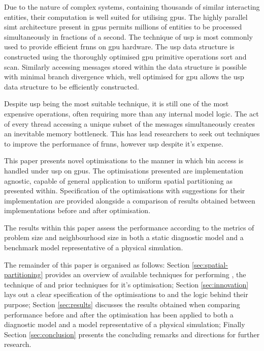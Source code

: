   Due to the nature of complex systems, containing thousands of similar interacting entities, their computation is well suited for utilising \glspl{gpu}. The highly parallel \gls{simt} architecture present in \glspl{gpu} permits millions of entities to be processed simultaneously in fractions of a second. The technique of \gls{usp} is most commonly used to provide efficient \gls{frnns} on \gls{gpu} hardware. The \gls{usp} data structure is constructed using the thoroughly optimised \gls{gpu} primitive operations sort and scan. Similarly accessing messages stored within the data structure is possible with minimal branch divergence which, well optimised for \gls{gpu} allows the \gls{usp} data structure to be efficiently constructed.
  
  Despite \gls{usp} being the most suitable technique, it is still one of the most expensive operations, often requiring more than any internal model logic. The act of every thread accessing a unique subset of the messages simultaneously creates an inevitable memory bottleneck. This has lead researchers to seek out techniques to improve the performance of \gls{frnns}\cite{GS*10,Hoe14,HY*15}, however \gls{usp} despite it's expense.
  
  This paper presents novel optimisations to the manner in which bin access is handled under \gls{usp} on \glspl{gpu}. The optimisations presented are implementation agnostic, capable of general application to uniform spatial partitioning as presented within. Specification of the optimisations with suggestions for their implementation are provided alongside a comparison of results obtained between implementations before and after optimisation. 
  
  The results within this paper assess the performance according to the metrics of problem size and neighbourhood size in both a static diagnostic model and a benchmark model representative of a physical simulation.
  
  The remainder of this paper is organised as follows: Section \ref{sec:spatial-partitioning} provides an overview of available techniques for performing , the technique of  and prior techniques for it's optimisation; Section \ref{sec:innovation} lays out a clear specification of the optimisations to  and the logic behind their purpose; Section \ref{sec:results} discusses the results obtained when comparing performance before and after the optimisation has been applied to both a diagnostic model and a model representative of a physical simulation; Finally Section \ref{sec:conclusion} presents the concluding remarks and directions for further research.
  
  
